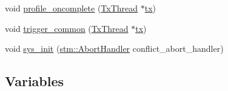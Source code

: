 \begin{DoxyCompactItemize}
\item 
void \hyperlink{namespacestm_ad9c526edd45fa3fe417fc3b8ee75467a}{profile\-\_\-oncomplete} (\hyperlink{structstm_1_1TxThread}{Tx\-Thread} $\ast$\hyperlink{stmskip_8cc_a0f1c58699b83ce5a08bd9ee859250d72}{tx})
\item 
void \hyperlink{namespacestm_a7691058d97dd9bb3444ab2200a90e54b}{trigger\-\_\-common} (\hyperlink{structstm_1_1TxThread}{Tx\-Thread} $\ast$\hyperlink{stmskip_8cc_a0f1c58699b83ce5a08bd9ee859250d72}{tx})
\item 
void \hyperlink{namespacestm_aac29e08fdc4a251a12088bd799e7a4f4}{sys\-\_\-init} (\hyperlink{namespacestm_a8c4b0bd094cade5163014a1f0a17d4cd}{stm\-::\-Abort\-Handler} conflict\-\_\-abort\-\_\-handler)
\end{DoxyCompactItemize}
\subsection*{Variables}
